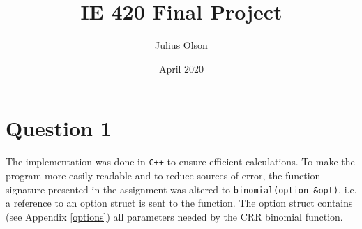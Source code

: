 \documentclass{article}
\title{IE 420 Final Project}
\author{Julius Olson}
\date{April 2020}
\begin{document}
\maketitle{}
\thispagestyle{fancy}

\section*{Question 1}

The implementation was done in \lstinline{C++} to ensure efficient calculations. To make the program more easily readable and to reduce sources of error, the function signature presented in the assignment was altered to \lstinline{binomial(option &opt)}, i.e. a reference to an option struct is sent to the function. The option struct contains (see Appendix \ref{options}) all parameters needed by the CRR binomial function.
\end{document}
